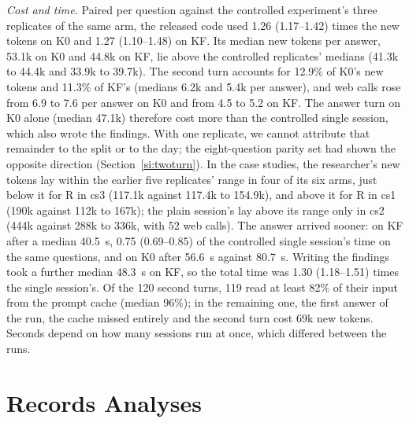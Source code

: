 \documentclass[journal=mamobx,manuscript=suppinfo]{achemso}
\begin{document}
\emph{Cost and time.}
Paired per question against the controlled experiment's three replicates of the same arm, the released code used 1.26 (1.17--1.42) times the new tokens on K0 and 1.27 (1.10--1.48) on KF.
Its median new tokens per answer, 53.1k on K0 and 44.8k on KF, lie above the controlled replicates' medians (41.3k to 44.4k and 33.9k to 39.7k).
The second turn accounts for 12.9\% of K0's new tokens and 11.3\% of KF's (medians 6.2k and 5.4k per answer), and web calls rose from 6.9 to 7.6 per answer on K0 and from 4.5 to 5.2 on KF.
The answer turn on K0 alone (median 47.1k) therefore cost more than the controlled single session, which also wrote the findings.
With one replicate, we cannot attribute that remainder to the split or to the day; the eight-question parity set had shown the opposite direction (Section~\ref{si:twoturn}).
In the case studies, the researcher's new tokens lay within the earlier five replicates' range in four of its six arms, just below it for R in cs3 (117.1k against 117.4k to 154.9k), and above it for R in cs1 (190k against 112k to 167k); the plain session's lay above its range only in cs2 (444k against 288k to 336k, with 52 web calls).
The answer arrived sooner: on KF after a median 40.5~s, 0.75 (0.69--0.85) of the controlled single session's time on the same questions, and on K0 after 56.6~s against 80.7~s.
Writing the findings took a further median 48.3~s on KF, so the total time was 1.30 (1.18--1.51) times the single session's.
Of the 120 second turns, 119 read at least 82\% of their input from the prompt cache (median 96\%); in the remaining one, the first answer of the run, the cache missed entirely and the second turn cost 69k new tokens.
Seconds depend on how many sessions run at once, which differed between the runs.

\section{Records Analyses}
\label{si:records}
\end{document}
